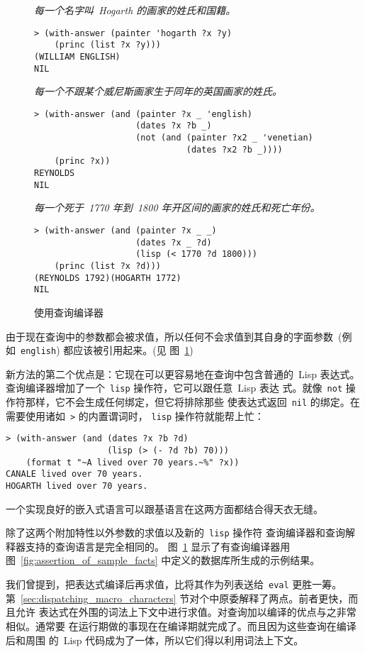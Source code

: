 \begin{figure}
  \emph{每一个名字叫~Hogarth 的画家的姓氏和国籍。}
\begin{lstlisting}
> (with-answer (painter 'hogarth ?x ?y)
    (princ (list ?x ?y)))
(WILLIAM ENGLISH)
NIL
\end{lstlisting}
  \emph{每一个不跟某个威尼斯画家生于同年的英国画家的姓氏。}
\begin{lstlisting}
> (with-answer (and (painter ?x _ 'english)
                    (dates ?x ?b _)
                    (not (and (painter ?x2 _ 'venetian)
                              (dates ?x2 ?b _))))
    (princ ?x))
REYNOLDS
NIL
\end{lstlisting}
  \emph{每一个死于~1770 年到~1800 年开区间的画家的姓氏和死亡年份。}
\begin{lstlisting}
> (with-answer (and (painter ?x _ _)
                    (dates ?x _ ?d)
                    (lisp (< 1770 ?d 1800)))
    (princ (list ?x ?d)))
(REYNOLDS 1792)(HOGARTH 1772)
NIL
\end{lstlisting}
  \caption{使用查询编译器}
  \label{fig:the_query_compiler_in_use}
\end{figure}

由于现在查询中的参数都会被求值，所以任何不会求值到其自身的字面参数~(例
如~\texttt{english}) 都应该被引用起来。(见
图~\ref{fig:the_query_compiler_in_use})

新方法的第二个优点是：它现在可以更容易地在查询中包含普通的~Lisp 表达式。
查询编译器增加了一个~\texttt{lisp} 操作符，它可以跟任意~Lisp 表达
式。就像~\texttt{not} 操作符那样，它不会生成任何绑定，但它将排除那些
使表达式返回~\texttt{nil} 的绑定。在需要使用诸如~\texttt{>} 的内置谓词时，
\texttt{lisp} 操作符就能帮上忙：
\begin{lstlisting}
> (with-answer (and (dates ?x ?b ?d)
                    (lisp (> (- ?d ?b) 70)))
    (format t "~A lived over 70 years.~%" ?x))
CANALE lived over 70 years.
HOGARTH lived over 70 years.
\end{lstlisting}

一个实现良好的嵌入式语言可以跟基语言在这两方面都结合得天衣无缝。

除了这两个附加特性以外\pozhehao{}参数的求值以及新的~\texttt{lisp} 操作符
\pozhehao{}查询编译器和查询解释器支持的查询语言是完全相同的。
图~\ref{fig:the_query_compiler_in_use} 显示了有查询编译器用
图~\ref{fig:assertion_of_sample_facts} 中定义的数据库所生成的示例结果。

我们曾提到，把表达式编译后再求值，比将其作为列表送给~\texttt{eval} 更胜一筹。
第~\ref{sec:dispatching_macro_characters} 节对个中原委解释了两点。前者更快，而且允许
表达式在外围的词法上下文中进行求值。对查询加以编译的优点与之非常相似。通常要
在运行期做的事现在在编译期就完成了。而且因为这些查询在编译后和周围
的~Lisp 代码成为了一体，所以它们得以利用词法上下文。


